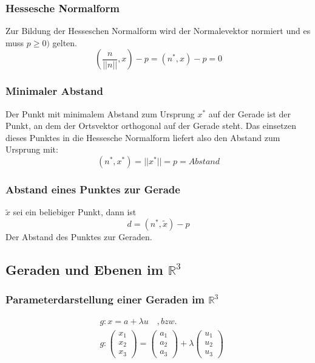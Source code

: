 \documentclass[12pt,a4paper]{report}%
\numberwithin{equation}{section}
\newcommand{\R}{\mathbb{R}} %
\def\vecT#1{\left(\begin{array}{c} #1 \end{array}\right)}
\numberwithin{equation}{subsection}
\begin{document}
    \subsubsection{Hessesche Normalform}
    Zur Bildung der Hesseschen Normalform wird der Normalevektor normiert und es muss $p \geq 0)$ gelten. 
    \begin{equation}
      \left(\frac{n}{||n||},x\right)-p = (n^*,x)-p = 0
    \end{equation}
    \subsubsection{Minimaler Abstand}
    Der Punkt mit minimalem Abstand zum Ursprung $x^*$ auf der Gerade ist der Punkt, an dem der Ortsvektor orthogonal auf der Gerade steht. Das einsetzen dieses Punktes in die Hessesche Normalform liefert also den Abstand zum Ursprung mit:
    \begin{equation}
    (n^*,x^*)=||x^*|| = p = Abstand
    \end{equation}
    \subsubsection{Abstand eines Punktes zur Gerade}
    $\tilde{x}$ sei ein beliebiger Punkt, dann ist
    \begin{equation}
      d = (n^*, \tilde{x})-p
    \end{equation}
    Der Abstand des Punktes zur Geraden.
  \subsection{Geraden und Ebenen im $\R^3$}
    \subsubsection{Parameterdarstellung einer Geraden im $\R^3$}
    \begin{align}
      &g: x = a + \lambda u \quad ,bzw. \nonumber \\
      &g: \vecT{x_1 \\ x_2 \\ x_3} = \vecT{a_1 \\ a_2 \\ a_3} + \lambda \vecT{u_1 \\ u_2 \\ u_3}
    \end{align}
\end{document}
